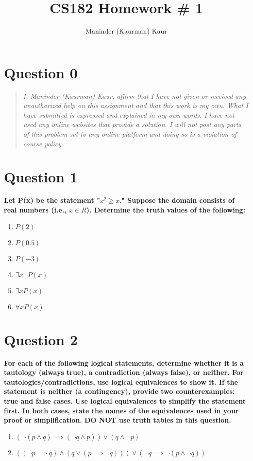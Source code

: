 \documentclass[11pt]{article}
\title{CS182 Homework \# 1}
\author{Maninder (Kaurman) Kaur}
\begin{document}
\maketitle

\section*{Question 0}
\begin{quote}
    \textit{I, Maninder (Kaurman) Kaur, affirm that I have not given or received any unauthorized help on this assignment and that this work is my own. What I have submitted is expressed and explained in my own words. I have not used any online websites that provide a solution. I will not post any parts of this problem set to any online platform and doing so is a violation of course policy.}
\end{quote}

\clearpage
\section*{Question 1}

    \textbf{Let P(x) be the statement "\(x^2 \geq x.\)" Suppose the domain consists of real numbers (i.e., \(x \in R\)). Determine the truth values of the following:}

    \begin{enumerate}[label=(\alph*)]
        \item \(P(2)\)
        \item \(P(0.5)\)
        \item \(P(-3)\)
        \item \(\exists x \neg P(x)\)
        \item \(\exists x P(x)\)
        \item \(\forall x P(x)\)
    \end{enumerate}


\clearpage
\section*{Question 2}
    \textbf{For each of the following logical statements, determine whether it is a tautology (always true), a contradiction (always false), or neither. For tautologies/contradictions, use logical equivalences to show it. If the statement is neither (a contingency), provide two counterexamples: true and false cases. Use logical equivalences to simplify the statement first. In both cases, state the names of the equivalences used in your proof or simplification. DO NOT use truth tables in this question.}
    \begin{enumerate}[label=(\alph*)]
        \item \((\neg(p\land q) \implies (\neg q \land p)) \lor (q \land \neg p)\)
        \item \(((\neg p \implies q) \land (q \lor (p \implies \neg q))) \lor (\neg q \implies \neg (p \land \neg q))\)
    \end{enumerate}
\end{document}
